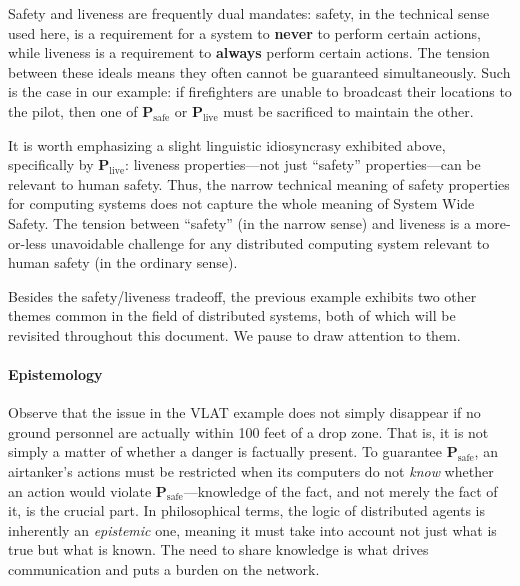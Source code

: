 \documentclass[]             %
{NASA}                       %
\theoremstyle{definition}
\begin{document}
Safety and liveness are frequently dual mandates: safety, in the technical sense
used here, is a requirement for a system to \textbf{never} to perform certain
actions, while liveness is a requirement to \textbf{always} perform
certain actions. The tension between these ideals means they often
cannot be guaranteed simultaneously. Such is the case in our example:
if firefighters are unable to broadcast their locations to the pilot,
then one of \(\textbf{P}_\textrm{safe}\) or \(\textbf{P}_\textrm{live}\) must be sacrificed to maintain the other.

It is worth emphasizing a slight linguistic idiosyncrasy exhibited above, specifically by $\textbf{P}_\textrm{live}$:
liveness properties---not just ``safety'' properties---can
be relevant to human safety. Thus, the narrow technical meaning of
safety properties for computing systems does not capture the whole
meaning of System Wide Safety. The tension between ``safety'' (in the narrow sense) and liveness is a more-or-less unavoidable challenge for any distributed computing system relevant to human safety (in the ordinary sense).

Besides the safety/liveness tradeoff, the previous example exhibits
two other themes common in the field of distributed systems, both of which will be revisited throughout this document. We pause to draw attention to them.

\paragraph{Epistemology}
Observe that the issue in the VLAT example does not simply disappear
if no ground personnel are actually within 100 feet of a drop
zone. That is, it is not simply a matter of whether a danger is
factually present. To guarantee \(\textbf{P}_\textrm{safe}\), an
airtanker's actions must be restricted when its computers do not
\emph{know} whether an action would violate
\(\textbf{P}_\textrm{safe}\)---knowledge of the fact, and not merely
the fact of it, is the crucial part. In philosophical terms, the logic
of distributed agents is inherently an \emph{epistemic} one, meaning
it must take into account not just what is true but what is known. The
need to share knowledge is what drives communication and puts a burden
on the network.
\end{document}
